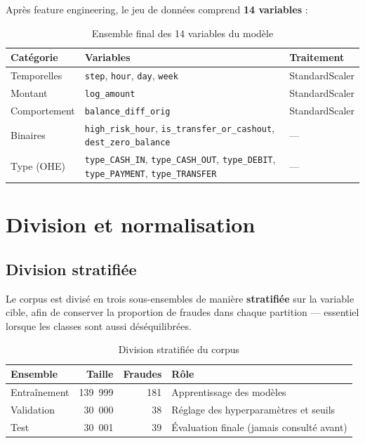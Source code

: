 Après feature engineering, le jeu de données comprend \textbf{14 variables} :

\begin{table}[H]
\centering
\caption{Ensemble final des 14 variables du modèle}
\label{tab:final_features}
\begin{tabular}{p{2.5cm}p{6cm}p{3cm}}
\toprule
\textbf{Catégorie} & \textbf{Variables} & \textbf{Traitement} \\
\midrule
Temporelles  & \texttt{step}, \texttt{hour}, \texttt{day}, \texttt{week} & StandardScaler \\
Montant      & \texttt{log\_amount} & StandardScaler \\
Comportement & \texttt{balance\_diff\_orig} & StandardScaler \\
Binaires     & \texttt{high\_risk\_hour}, \texttt{is\_transfer\_or\_cashout},
               \texttt{dest\_zero\_balance} & --- \\
Type (OHE)   & \texttt{type\_CASH\_IN}, \texttt{type\_CASH\_OUT}, \texttt{type\_DEBIT},
               \texttt{type\_PAYMENT}, \texttt{type\_TRANSFER} & --- \\
\bottomrule
\end{tabular}
\end{table}

\section{Division et normalisation}

\subsection{Division stratifiée}

Le corpus est divisé en trois sous-ensembles de manière \textbf{stratifiée} sur la variable
cible, afin de conserver la proportion de fraudes dans chaque partition --- essentiel
lorsque les classes sont aussi déséquilibrées.

\begin{table}[H]
\centering
\caption{Division stratifiée du corpus}
\label{tab:splits}
\begin{tabular}{lrrl}
\toprule
\textbf{Ensemble} & \textbf{Taille} & \textbf{Fraudes} & \textbf{Rôle} \\
\midrule
Entraînement & 139~999 & 181 & Apprentissage des modèles \\
Validation   & 30~000  & 38  & Réglage des hyperparamètres et seuils \\
Test         & 30~001  & 39  & Évaluation finale (jamais consulté avant) \\
\bottomrule
\end{tabular}
\end{table}

